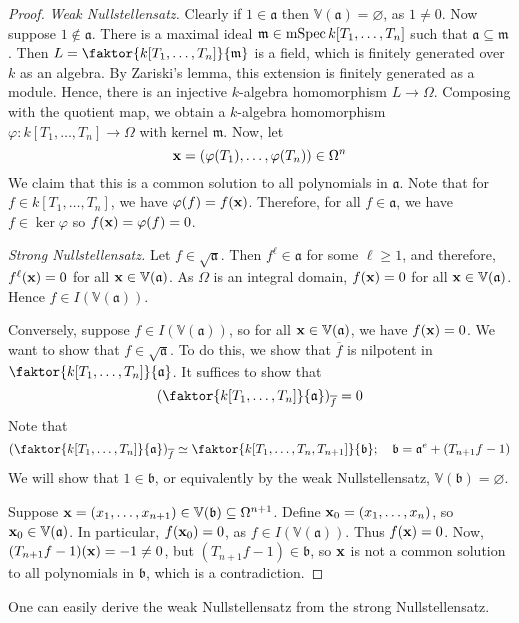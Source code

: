 \begin{proof}
    \emph{Weak Nullstellensatz.}
    Clearly if \( 1 \in \mathfrak a \) then \( \mathbb V(\mathfrak a) = \varnothing \), as \( 1 \neq 0 \).
    Now suppose \( 1 \notin \mathfrak a \).
    There is a maximal ideal \( \mathfrak m \in \operatorname{mSpec} k[T_1, \dots, T_n] \) such that \( \mathfrak a \subseteq \mathfrak m \).
    Then \( L = \faktor{k[T_1, \dots, T_n]}{\mathfrak m} \) is a field, which is finitely generated over \( k \) as an algebra.
    By Zariski's lemma, this extension is finitely generated as a module.
    Hence, there is an injective \( k \)-algebra homomorphism \( L \to \Omega \).
    Composing with the quotient map, we obtain a \( k \)-algebra homomorphism \( \varphi : k[T_1, \dots, T_n] \to \Omega \) with kernel \( \mathfrak m \).
    Now, let
    \[ \vb x = (\varphi(T_1), \dots, \varphi(T_n)) \in \Omega^n \]
    We claim that this is a common solution to all polynomials in \( \mathfrak a \).
    Note that for \( f \in k[T_1, \dots, T_n] \), we have \( \varphi(f) = f(\vb x) \).
    Therefore, for all \( f \in \mathfrak a \), we have \( f \in \ker \varphi \) so \( f(\vb x) = \varphi(f) = 0 \).

    \emph{Strong Nullstellensatz.}
    Let \( f \in \sqrt{\mathfrak a} \).
    Then \( f^\ell \in \mathfrak a \) for some \( \ell \geq 1 \), and therefore, \( f^\ell(\vb x) = 0 \) for all \( \vb x \in \mathbb V(\mathfrak a) \).
    As \( \Omega \) is an integral domain, \( f(\vb x) = 0 \) for all \( \vb x \in \mathbb V(\mathfrak a) \).
    Hence \( f \in I(\mathbb V(\mathfrak a)) \).

    Conversely, suppose \( f \in I(\mathbb V(\mathfrak a)) \), so for all \( \vb x \in \mathbb V(\mathfrak a) \), we have \( f(\vb x) = 0 \).
    We want to show that \( f \in \sqrt{\mathfrak a} \).
    To do this, we show that \( \overline f \) is nilpotent in \( \faktor{k[T_1, \dots, T_n]}{\mathfrak a} \).
    It suffices to show that
    \[ \qty(\faktor{k[T_1, \dots, T_n]}{\mathfrak a})_{\overline f} = 0 \]
    Note that
    \[ \qty(\faktor{k[T_1, \dots, T_n]}{\mathfrak a})_{\overline f} \simeq \faktor{k[T_1, \dots, T_n, T_{n+1}]}{\mathfrak b};\quad \mathfrak b = \mathfrak a^e + (T_{n+1} f - 1) \]
    We will show that \( 1 \in \mathfrak b \), or equivalently by the weak Nullstellensatz, \( \mathbb V(\mathfrak b) = \varnothing \).

    Suppose \( \vb x = (x_1, \dots, x_{n+1}) \in \mathbb V(\mathfrak b) \subseteq \Omega^{n+1} \).
    Define \( \vb x_0 = (x_1, \dots, x_n) \), so \( \vb x_0 \in \mathbb V(\mathfrak a) \).
    In particular, \( f(\vb x_0) = 0 \), as \( f \in I(\mathbb V(\mathfrak a)) \).
    Thus \( f(\vb x) = 0 \).
    Now, \( (T_{n+1} f - 1)(\vb x) = -1 \neq 0 \), but \( (T_{n+1} f - 1) \in \mathfrak b \), so \( \vb x \) is not a common solution to all polynomials in \( \mathfrak b \), which is a contradiction.
\end{proof}
One can easily derive the weak Nullstellensatz from the strong Nullstellensatz.

